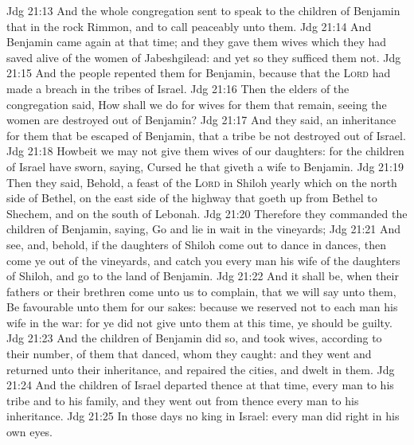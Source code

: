 \vs Jdg 21:13 And the whole congregation sent  to speak to the children of Benjamin that  in the rock Rimmon, and to call peaceably unto them.
\vs Jdg 21:14 And Benjamin came again at that time; and they gave them wives which they had saved alive of the women of Jabeshgilead: and yet so they sufficed them not.
\vs Jdg 21:15 And the people repented them for Benjamin, because that the \textsc{Lord} had made a breach in the tribes of Israel.
\vs Jdg 21:16 Then the elders of the congregation said, How shall we do for wives for them that remain, seeing the women are destroyed out of Benjamin?
\vs Jdg 21:17 And they said,  an inheritance for them that be escaped of Benjamin, that a tribe be not destroyed out of Israel.
\vs Jdg 21:18 Howbeit we may not give them wives of our daughters: for the children of Israel have sworn, saying, Cursed  he that giveth a wife to Benjamin.
\vs Jdg 21:19 Then they said, Behold,  a feast of the \textsc{Lord} in Shiloh yearly  which  on the north side of Bethel, on the east side of the highway that goeth up from Bethel to Shechem, and on the south of Lebonah.
\vs Jdg 21:20 Therefore they commanded the children of Benjamin, saying, Go and lie in wait in the vineyards;
\vs Jdg 21:21 And see, and, behold, if the daughters of Shiloh come out to dance in dances, then come ye out of the vineyards, and catch you every man his wife of the daughters of Shiloh, and go to the land of Benjamin.
\vs Jdg 21:22 And it shall be, when their fathers or their brethren come unto us to complain, that we will say unto them, Be favourable unto them for our sakes: because we reserved not to each man his wife in the war: for ye did not give unto them at this time,  ye should be guilty.
\vs Jdg 21:23 And the children of Benjamin did so, and took  wives, according to their number, of them that danced, whom they caught: and they went and returned unto their inheritance, and repaired the cities, and dwelt in them.
\vs Jdg 21:24 And the children of Israel departed thence at that time, every man to his tribe and to his family, and they went out from thence every man to his inheritance.
\vs Jdg 21:25 In those days  no king in Israel: every man did  right in his own eyes.
